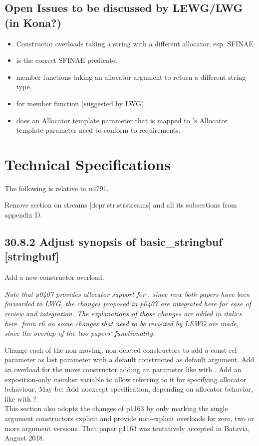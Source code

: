 \documentclass[ebook,11pt,article]{memoir}
\begin{document}
\section{Open Issues to be discussed by LEWG/LWG (in Kona?)}
\begin{itemize}
\item Constructor overloads taking a string with a different allocator, esp. SFINAE.
\item is  the correct SFINAE predicate.
\item {} member functions taking an allocator argument to return a different string type.
\item {} for  member function (suggested by LWG).
\item does an Allocator template parameter that is mapped to 's Allocator template parameter need to conform to  requirements.
\end{itemize}


\chapter{Technical Specifications}
The following is relative to n4791.

Remove section on  streams [depr.str.strstreams] and all its subsections from appendix D.

\section{30.8.2 Adjust synopsis of basic\_stringbuf [stringbuf]}
Add a new constructor overload.

\textit{Note that p0407 provides allocator support for , since now both papers have been forwarded to LWG, the changes proposed in p0407 are integrated here for ease of review and integration. The explanations of those changes are added in italics here. from r6 on some changes that need to be revisited by LEWG are made, since the overlap of the two papers' functionality.}

\begin{em}
Change each of the non-moving, non-deleted constructors to add a const-ref  parameter as last parameter with a default constructed  as default argument. Add an overload for the move constructor adding an  parameter like with . Add an exposition-only member variable  to allow referring to it for specifying allocator behaviour. May be: Add noexcept specification, depending on allocator behavior, like with ?\
\\
This section also adopts the changes of p1163 by only marking the single argument constructors explicit and provide non-explicit overloads for zero, two or more argument versions. That paper p1163 was tentatively accepted in Batavia, August 2018.
\end{em}
\end{document}
